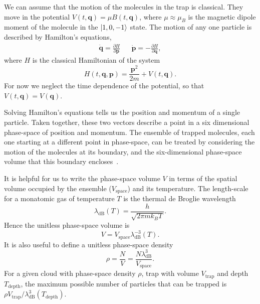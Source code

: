 We can assume that the motion of the molecules in the trap is classical. They
move in the potential $V(t, \mathbf{q}) = \mu B(t, \mathbf{q})$, where
$\mu\approx\mu_B$ is the magnetic dipole moment of the molecule in the
$\ket{1,0,-1}$ state.  The motion of any one particle is described by Hamilton's
equations,~\cite{Lichtenberg1969}
%
\begin{align}
  \label{design:eq:hamilton}
  \dot{\mathbf{q}} =  \frac{\partial H}{\partial \mathbf{p}} &&
  \dot{\mathbf{p}} = -\frac{\partial H}{\partial \mathbf{q}},
\end{align}
%
where $H$ is the classical Hamiltonian of the system
\begin{equation}
  H(t, \mathbf{q}, \mathbf{p}) = \frac{\mathbf{p}^2}{2m} + V(t, \mathbf{q}).
\end{equation}
For now we neglect the time dependence of the potential, so that $V(t,
\mathbf{q}) = V(\mathbf{q})$.

Solving Hamilton's equations tells us the position and momentum of a single
particle. Taken together, these two vectors describe a point in a six
dimensional phase-space of position and momentum. The ensemble of
trapped molecules, each one starting at a different point in phase-space, can
be treated by considering the motion of the molecules at its
boundary, and the six-dimensional phase-space volume that this
boundary encloses~\cite{Hand1998}.

It is helpful for us to write the phase-space volume $V$ in terms of the
spatial volume occupied by the ensemble ($V_\text{space}$) and its temperature.
The length-scale for a monatomic gas of temperature $T$ is the thermal de
Broglie wavelength~\cite{blundell2}
%
\begin{equation}
  \lambda_\text{dB}(T) = \frac{h}{\sqrt{2 \pi m k_B T}}.
\end{equation}
%
Hence the unitless phase-space volume is
%
\begin{equation}
  V = V_\text{space} \lambda_\text{dB}^{-3}(T).
\end{equation}
%
It is also useful to define a unitless phase-space
density~\cite{PhysRevA.52.1423}
%
\begin{equation}
  \rho = \frac{N}{V} = \frac{N \lambda_\text{dB}^3}{V_\text{space}}.
\end{equation}
%
For a given cloud with phase-space density $\rho$, trap with volume
$V_\text{trap}$ and depth $T_\text{depth}$,
the maximum possible number of particles that can be trapped is $\rho
V_\text{trap}/\lambda_\text{dB}^3(T_\text{depth})$.

